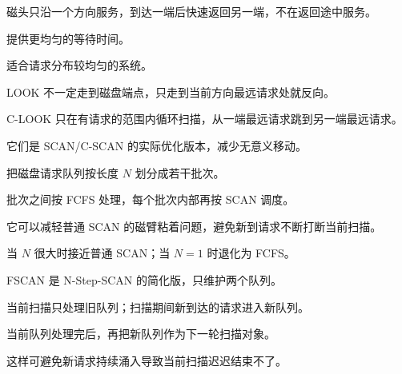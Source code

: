 \begin{points}
  \item 磁头只沿一个方向服务，到达一端后快速返回另一端，不在返回途中服务。
  \item 提供更均匀的等待时间。
  \item 适合请求分布较均匀的系统。
\end{points}


\begin{points}
  \item LOOK 不一定走到磁盘端点，只走到当前方向最远请求处就反向。
  \item C-LOOK 只在有请求的范围内循环扫描，从一端最远请求跳到另一端最远请求。
  \item 它们是 SCAN/C-SCAN 的实际优化版本，减少无意义移动。
\end{points}


\begin{points}
  \item 把磁盘请求队列按长度 $N$ 划分成若干批次。
  \item 批次之间按 FCFS 处理，每个批次内部再按 SCAN 调度。
  \item 它可以减轻普通 SCAN 的磁臂粘着问题，避免新到请求不断打断当前扫描。
  \item 当 $N$ 很大时接近普通 SCAN；当 $N=1$ 时退化为 FCFS。
\end{points}


\begin{points}
  \item FSCAN 是 N-Step-SCAN 的简化版，只维护两个队列。
  \item 当前扫描只处理旧队列；扫描期间新到达的请求进入新队列。
  \item 当前队列处理完后，再把新队列作为下一轮扫描对象。
  \item 这样可避免新请求持续涌入导致当前扫描迟迟结束不了。
\end{points}


